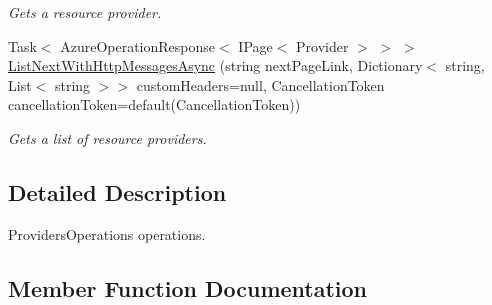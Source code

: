 \begin{DoxyCompactItemize}
\begin{DoxyCompactList}\small\item\em Gets a resource provider. \end{DoxyCompactList}\item 
Task$<$ Azure\+Operation\+Response$<$ I\+Page$<$ Provider $>$ $>$ $>$ \hyperlink{interface_microsoft_1_1_azure_1_1_management_1_1_resources_1_1_i_providers_operations_ab76a2a03a1c6f6b09b92a0d302834527}{List\+Next\+With\+Http\+Messages\+Async} (string next\+Page\+Link, Dictionary$<$ string, List$<$ string $>$$>$ custom\+Headers=null, Cancellation\+Token cancellation\+Token=default(Cancellation\+Token))
\begin{DoxyCompactList}\small\item\em Gets a list of resource providers. \end{DoxyCompactList}\end{DoxyCompactItemize}


\subsection{Detailed Description}
Providers\+Operations operations. 



\subsection{Member Function Documentation}
